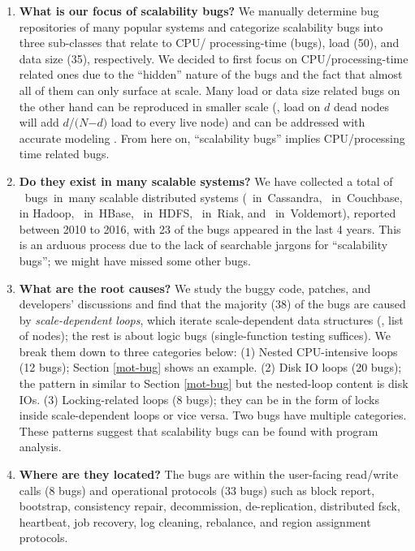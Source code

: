 \begin{enumerate}

\item {\bf What is our focus of scalability bugs?}  
%
We manually determine bug repositories of many popular systems and 
categorize scalability bugs into three sub-classes that relate to
CPU/ processing-time (\totAll bugs), load (50), and data size (35),
respectively.
%
We decided to first focus on CPU/processing-time related ones due to the 
``hidden'' nature of the bugs and the fact that almost all of them can 
only surface at scale.
%
Many load or data size related bugs on the other hand can be reproduced in
smaller scale (\eg, load on $d$ dead nodes will add $d$/$(N$$-$$d)$ load
to every live node) and can be addressed with accurate modeling
\cite{Guo+13-CureIsWorse}.
%
From here on, ``scalability bugs'' implies CPU/processing time related
bugs.

\item {\bf Do they exist in many scalable systems?}  We have collected a
total of \totAll\ bugs~in~many scalable distributed systems
(\totCass~in~Cassandra, \totCouch~in~Couchbase, \totHadoop in Hadoop,
\totHBase~in~HBase, \totHDFS~in~HDFS, \totRiak~in~Riak, and
\totVold~in~Voldemort),
%
reported between 2010 to 2016, with 23 of the bugs appeared in the last 4
years.
%
This is an arduous process due to the lack of searchable jargons for
``scalability bugs''; we might have missed some other bugs.

\item {\bf What are the root causes?}
%
We study the buggy code, patches, and developers' discussions and find
that the majority (38) of the bugs are caused by {\em scale-dependent
loops}, which iterate scale-dependent data structures (\eg, list of
nodes); the rest is about logic bugs (single-function testing suffices).
We break them down to three categories below:
%
(1) Nested CPU-intensive loops (12 bugs);
Section \ref{mot-bug} shows an example.
%
(2) Disk IO loops (20 bugs);  the pattern in similar to
Section \ref{mot-bug} but the nested-loop content is disk IOs.
%
(3) Locking-related loops (8 bugs); they can be in the form of locks
inside scale-dependent loops or vice versa.  Two bugs have multiple
categories.
%
%
These patterns suggest that scalability bugs can be found with program
analysis.



\item {\bf Where are they located?}  The bugs are within the user-facing
read/write calls (8 bugs) and operational protocols (33 bugs) such as
%
block report,
bootstrap,
consistency repair,
decommission,
de-replication,
distributed fsck,
heartbeat,
job recovery,
log cleaning,
rebalance, and
region assignment
protocols.


\end{enumerate}
